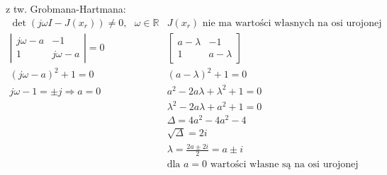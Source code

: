 z tw. Grobmana-Hartmana:\\
$\begin{array}{ll}
\det(j\omega I-J(x_r)) \neq 0, \ \ \ \omega \in \mathbb{R} & J(x_r)\text{ nie ma wartości własnych na osi urojonej}\\
 \left| \begin{array}{cc}     j\omega-a& -1 \\ 1 & j\omega-a    \end{array}\right|=0 &  \left[ \begin{array}{cc}    a-\lambda & -1 \\ 1 & a- \lambda   \end{array}\right]\\
(j\omega-a)^2+1=0 & (a-\lambda)^2+1=0\\
j\omega-1= \pm j \Rightarrow \boxed{ a=0} & a^2-2a\lambda +\lambda^2+1 =0\\
&\lambda^2-2a\lambda+a^2+1 = 0\\
&\Delta=4a^2-4a^2-4\\
&\sqrt{\Delta}=2i\\
&\lambda=\frac{2a \pm 2i}{2} = a \pm i\\
&\text{dla } a=0 \text{ wartości własne są na osi urojonej}
\end{array}$\\


\pagebreak
